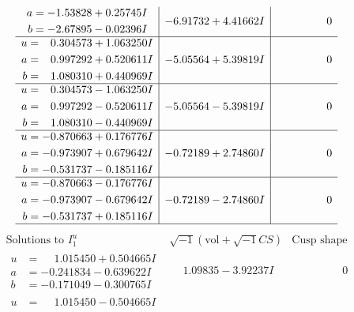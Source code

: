 \documentclass[1p]{elsarticle_modified}
\theoremstyle{definition}
\newcommand{\I}{\sqrt{-1}}
\begin{document}
$$\begin{array}{c|c|c}
\begin{aligned}
a &= -1.53828 + 0.25745 I \\
b &= -2.67895 - 0.02396 I\end{aligned}
 & -6.91732 + 4.41662 I & \phantom{-0.000000 } 0 \\ \hline\begin{aligned}
u &= \phantom{-}0.304573 + 1.063250 I \\
a &= \phantom{-}0.997292 + 0.520611 I \\
b &= \phantom{-}1.080310 + 0.440969 I\end{aligned}
 & -5.05564 + 5.39819 I & \phantom{-0.000000 } 0 \\ \hline\begin{aligned}
u &= \phantom{-}0.304573 - 1.063250 I \\
a &= \phantom{-}0.997292 - 0.520611 I \\
b &= \phantom{-}1.080310 - 0.440969 I\end{aligned}
 & -5.05564 - 5.39819 I & \phantom{-0.000000 } 0 \\ \hline\begin{aligned}
u &= -0.870663 + 0.176776 I \\
a &= -0.973907 + 0.679642 I \\
b &= -0.531737 - 0.185116 I\end{aligned}
 & -0.72189 + 2.74860 I & \phantom{-0.000000 } 0 \\ \hline\begin{aligned}
u &= -0.870663 - 0.176776 I \\
a &= -0.973907 - 0.679642 I \\
b &= -0.531737 + 0.185116 I\end{aligned}
 & -0.72189 - 2.74860 I & \phantom{-0.000000 } 0\\
 \hline 
 \end{array}$$\newpage$$\begin{array}{c|c|c}  
\text{Solutions to }I^u_{1}& \I (\text{vol} + \sqrt{-1}CS) & \text{Cusp shape}\\
 \hline 
\begin{aligned}
u &= \phantom{-}1.015450 + 0.504665 I \\
a &= -0.241834 - 0.639622 I \\
b &= -0.171049 - 0.300765 I\end{aligned}
 & \phantom{-}1.09835 - 3.92237 I & \phantom{-0.000000 } 0 \\ \hline\begin{aligned}
u &= \phantom{-}1.015450 - 0.504665 I \\

\end{aligned}
\end{array}$$
\end{document}
